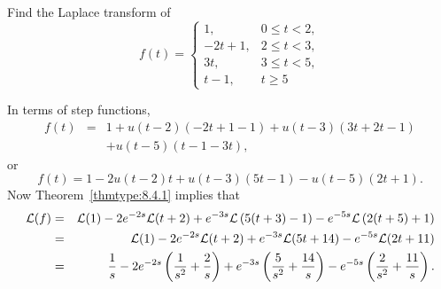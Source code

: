 \documentclass{ximera}
\begin{document}
\begin{example}\label{example:8.4.4}
 Find the Laplace transform of
\begin{equation} \label{eq:8.4.7}
f(t)=\left\{\begin{array}{cl}
 1,&0\leq t<2,\\
-2t+1,&2\leq t<3,\\
 3t,&3\leq t<5,\\
 t-1,&t\geq 5
\end{array}\right.
\end{equation}

\begin{center}
\end{center}

\begin{explanation}
In terms of step functions,
\begin{eqnarray*}
f(t)&=&1+u(t-2)(-2t+1-1)+u(t-3)(3t+2t-1)\\
&&+u(t-5)(t-1-3t),
\end{eqnarray*}
or
$$
f(t)=1-2u(t-2)t+u(t-3)(5t-1)-u(t-5)(2t+1).
$$
Now Theorem~\ref{thmtype:8.4.1} implies that
\begin{eqnarray*}
{\cal L}(f)&=&{\cal L}(1)-2e^{-2s}{\cal L}(t+2)+e^{-3s}{\cal
L}\left(5(t+3)-1\right)-e^{-5s}{\cal L}\left(2(t+5)+1\right)\\
&=&{\cal L}(1)-2e^{-2s}{\cal L}(t+2)+e^{-3s}{\cal
L}(5t+14)-e^{-5s}{\cal L}(2t+11)\\
&=&\frac{1}{s}-2e^{-2s}\left(\frac{1}{s^2}+\frac{2}{s}\right)+
e^{-3s}\left(\frac{5}{s^2}+\frac{14}{s}\right)-e^{-5s}\left(\frac{2}{s^2}+\frac{11}{s}\right).
\end{eqnarray*}
\end{explanation}
\end{example}
\end{document}
